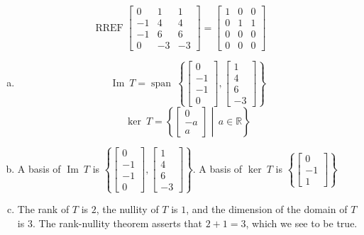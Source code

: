 \begin{exerciseAnswer} 


\[\operatorname{RREF} \left[\begin{array}{ccc}
0 & 1 & 1 \\
-1 & 4 & 4 \\
-1 & 6 & 6 \\
0 & -3 & -3
\end{array}\right] = \left[\begin{array}{ccc}
1 & 0 & 0 \\
0 & 1 & 1 \\
0 & 0 & 0 \\
0 & 0 & 0
\end{array}\right] \]


\begin{enumerate}[(a)]
\item \[\operatorname{Im}\ T = \operatorname{span}\  \left\{ \left[\begin{array}{c}
0 \\
-1 \\
-1 \\
0
\end{array}\right] , \left[\begin{array}{c}
1 \\
4 \\
6 \\
-3
\end{array}\right] \right\} \]\[\operatorname{ker}\ T =  \left\{ \left[\begin{array}{c}
0 \\
-a \\
a
\end{array}\right] \middle|\,a\in\mathbb{R}\right\} \]
\item  A basis of \(\operatorname{Im}\ T\) is \( \left\{ \left[\begin{array}{c}
0 \\
-1 \\
-1 \\
0
\end{array}\right] , \left[\begin{array}{c}
1 \\
4 \\
6 \\
-3
\end{array}\right] \right\} \). A basis of \(\operatorname{ker}\ T\) is \( \left\{ \left[\begin{array}{c}
0 \\
-1 \\
1
\end{array}\right] \right\} \)
\item  The rank of \(T\) is \( 2 \), the nullity of \(T\) is \( 1 \), and the dimension of the domain of \(T\) is \( 3 \). The rank-nullity theorem asserts that \( 2 + 1 = 3 \), which we see to be true. 
\end{enumerate}
    
\end{exerciseAnswer}
    
